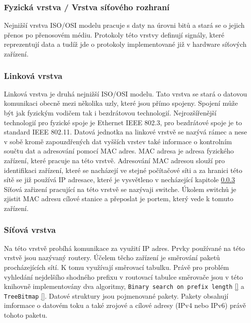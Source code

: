 \subsubsection{Fyzická vrstva / Vrstva síťového rozhraní}\label{layers:physical}
Nejnižší vrstva ISO/OSI modelu pracuje s daty na úrovni bitů a stará se o
jejich přenos po přenosovém médiu. Protokoly této vrstvy definují signály, které reprezentují data
a tudíž jde o protokoly implementované již v hardware síťových zařízení.

\subsubsection{Linková vrstva}\label{layers:link}
Linková vrstva je druhá nejnižší ISO/OSI modelu. Tato vrstva se stará o datovou komunikaci
obecně mezi několika uzly, které jsou přímo spojeny. Spojení může být jak fyzickým vodičem tak i
bezdrátovou technologií. Nejrozšířenější technologií pro fyzické spoje je Ethernet IEEE 802.3, pro bezdrátové spoje
je to standard IEEE 802.11. Datová jednotka na linkové vrstvě se nazývá rámec a nese v sobě kromě
zapouzdřených dat vyšších vrstev také informace o kontrolním součtu dat a adresování pomocí MAC adres.
MAC adresa je adresa fyzického zařízení, které pracuje na této vrstvě.
Adresování MAC adresou slouží pro identifikaci zařízení, které se nacházejí ve stejné počítačové síti
a za hranici této sítě se již používá IP adresace, které je vysvětleno v necházející kapitole \ref{layers:network}
Síťová zařizení pracující na této vrstvě se nazývaji switche. Úkolem switchů je zjistit MAC adresu cílové stanice a přeposlat je portem, který vede k tomuto zařízení.

\subsubsection{Síťová vrstva}\label{layers:network}
Na této vrstvě probíhá komunikace za využití IP adres. Prvky používané na této vrstvě jsou nazývaný routery.
Účelem těcho zařízení je směrování paketů procházejících sítí. K tomu využívají směrovací tabulku.
Právě pro problém vyhledání nejdelšího shodného prefixu v routovací tabulce směrovače jsou v této knihovně
implementovány dva algoritmy, \texttt{Binary search on prefix length} \ref{} a \texttt{TreeBitmap} \ref{}.
Datové struktury jsou pojmenované pakety. Pakety obsahují imformace o datovém toku a také zrojové a cílové adresy (IPv4 nebo IPv6) právě tohoto paketu.

